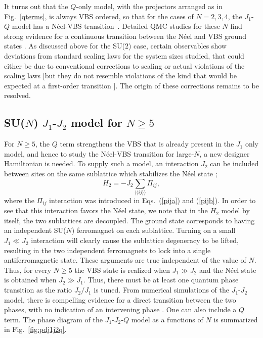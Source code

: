 \documentclass[10pt,pre,aps,twocolumn,showpacs,subscriptaddresses,floatfix]{revtex4}
\begin{document}
It turns out that the $Q$-only model, with the projectors arranged as in Fig.~\ref{qterms}, is always VBS ordered, so that for the cases of $N=2,3,4$, 
the $J_1$-$Q$ model has a N\'eel-VBS transition~\cite{Sandvik07,lou2009:sun}. Detailed QMC studies for these $N$ find strong evidence for a 
continuous transition between the N\'eel and VBS ground states \cite{melko2008:jq,kaul2011:su34,banerjee2010:log,banerjee2010:su3}. 
As discussed above for the SU($2$) case, certain observables show deviations from standard scaling laws for the system sizes studied, that could either 
be due to conventional corrections to scaling or actual violations of the scaling laws [but they do not resemble violations of the kind that would be 
expected at a first-order transition \cite{Sandvik10c}]. The origin of these corrections remains to be resolved.

\subsection{SU($N$) $J_1$-$J_2$ model for $N\geq 5$}
\label{ss:j1j2N}

For $N\geq 5$, the $Q$ term strengthens the VBS that is already present in the $J_1$ only model, and hence to study the N\'eel-VBS transition 
for large-$N$, a new designer Hamiltonian is needed. To supply such a model, an interaction $J_2$ can be included between sites on the same sublattice 
which stabilizes the N\'eel state \cite{kaul2011:j1j2};
\begin{equation}
H_{2}= -J_2 \sum_{\langle\langle ij\rangle\rangle} \Pi_{ij},
\end{equation}
where the $\Pi_{ij}$ interaction was introduced in Eqs.~(\ref{pija}) and (\ref{pijb}).
In order to see that this interaction favors the N\'eel state, we note that in the $H_{2}$ model by itself, the two sublattices 
are decoupled. The ground state corresponds to having an independent SU($N$) ferromagnet on each sublattice. Turning on a small $J_1\ll J_2$ 
interaction will clearly cause the sublattice degeneracy to be lifted, resulting in the two independent ferromagnets to lock into a single
antiferromagnetic state. These arguments are true independent of the value of $N$. Thus, for every $N\geq 5$ the VBS state is realized when 
$J_1\gg J_2$ and the N\'eel state is obtained when $J_2 \gg J_1$. Thus, there must be at least one quantum phase transition as the ratio
$J_2/J_1$ is tuned. From numerical simulations of the $J_1$-$J_2$ model, there is compelling evidence for a direct transition between the two 
phases, with no indication of an intervening phase \cite{kaul2011:j1j2}. One can also include a $Q$ term. The phase diagram of the $J_1$-$J_2$-$Q$ model as a functions 
of $N$ is summarized in Fig.~\ref{fig:pdj1j2q}.
\end{document}
